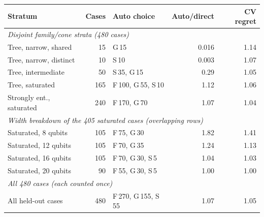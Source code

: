 \begin{tabular}{lrlrr}
\toprule
Stratum & Cases & Auto choice & Auto/direct & CV regret\\
\midrule
\multicolumn{5}{l}{\emph{Disjoint family/cone strata (480 cases)}}\\
Tree, narrow, shared & 15 & G\,15 & 0.016 & 1.14\\
Tree, narrow, distinct & 10 & S\,10 & 0.003 & 1.07\\
Tree, intermediate & 50 & S\,35, G\,15 & 0.29 & 1.05\\
Tree, saturated & 165 & F\,100, G\,55, S\,10 & 1.12 & 1.06\\
Strongly ent., saturated & 240 & F\,170, G\,70 & 1.07 & 1.04\\
\midrule
\multicolumn{5}{l}{\emph{Width breakdown of the 405 saturated cases (overlapping rows)}}\\
Saturated, 8 qubits & 105 & F\,75, G\,30 & 1.82 & 1.41\\
Saturated, 12 qubits & 105 & F\,70, G\,35 & 1.24 & 1.13\\
Saturated, 16 qubits & 105 & F\,70, G\,30, S\,5 & 1.04 & 1.03\\
Saturated, 20 qubits & 90 & F\,55, G\,30, S\,5 & 1.00 & 1.00\\
\midrule
\multicolumn{5}{l}{\emph{All 480 cases (each counted once)}}\\
All held-out cases & 480 & F\,270, G\,155, S\,55 & 1.07 & 1.05\\
\bottomrule
\end{tabular}
